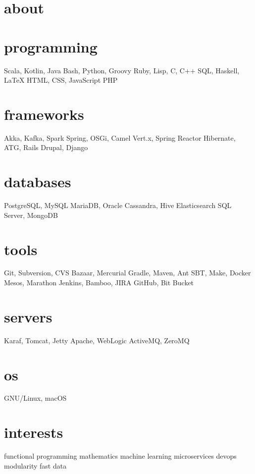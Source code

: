 \documentclass{friggeri-cv}
\begin{document}

\begin{aside}
    \section{about}
    \section{programming}
    Scala, Kotlin, Java
    Bash, Python, Groovy
    Ruby, Lisp, C, C++
    SQL, Haskell, \LaTeX
    HTML, CSS, JavaScript
    PHP
    \section{frameworks}
    Akka, Kafka, Spark
    Spring, OSGi, Camel
    Vert.x, Spring Reactor
    Hibernate, ATG, Rails
    Drupal, Django
    \section{databases}
    PostgreSQL, MySQL
    MariaDB, Oracle
    Cassandra, Hive
    Elasticsearch
    SQL Server, MongoDB
    \section{tools}
    Git, Subversion, CVS
    Bazaar, Mercurial
    Gradle, Maven, Ant
    SBT, Make, Docker
    Mesos, Marathon
    Jenkins, Bamboo, JIRA
    GitHub, Bit Bucket
    \section{servers}
    Karaf, Tomcat, Jetty
    Apache, WebLogic
    ActiveMQ, ZeroMQ
    \section{os}
    GNU/Linux, macOS
    \section{interests}
    functional programming
    mathematics
    machine learning
    microservices
    devops
    modularity
    fast data
\end{aside}
\end{document}
